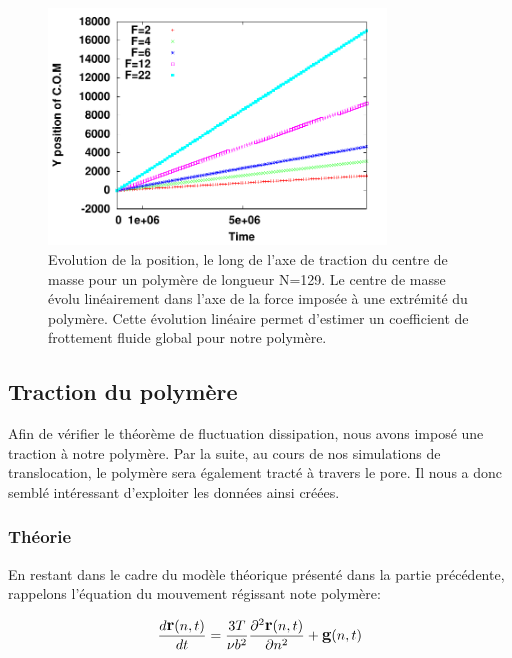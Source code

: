 \documentclass[a4paper,11pt]{article}
\begin{document}
\begin{figure}[H]
\begin{center}
\includegraphics[width=0.8\textwidth]{traction.pdf}

\caption{Evolution de la position, le long de l'axe de traction du centre de masse pour un polymère de longueur N=129. Le centre de masse évolu linéairement dans l'axe de la force imposée à une extrémité du polymère. Cette évolution linéaire permet d'estimer un coefficient de frottement fluide global pour notre polymère.}
\label{linfrot}
\end{center}
\end{figure}


\subsection{Traction du polymère}

Afin de vérifier le théorème de fluctuation dissipation, nous avons imposé une traction à notre polymère. Par la suite, au cours de nos simulations de translocation, le polymère sera également tracté à travers le pore. Il nous a donc semblé intéressant d'exploiter les données ainsi créées.

\subsubsection*{Théorie}

En restant dans le cadre du modèle théorique présenté dans la partie précédente, rappelons l'équation du mouvement régissant note polymère:

\begin{eqnarray}
\large{
\frac{d \textbf{r}(n,t)}{dt} =  \frac{3T}{\nu b^2}\frac{\partial ^2 \textbf{r}(n,t)}{\partial  n^2} + \textbf{g}(n,t)}
\end{eqnarray}
\end{document}
